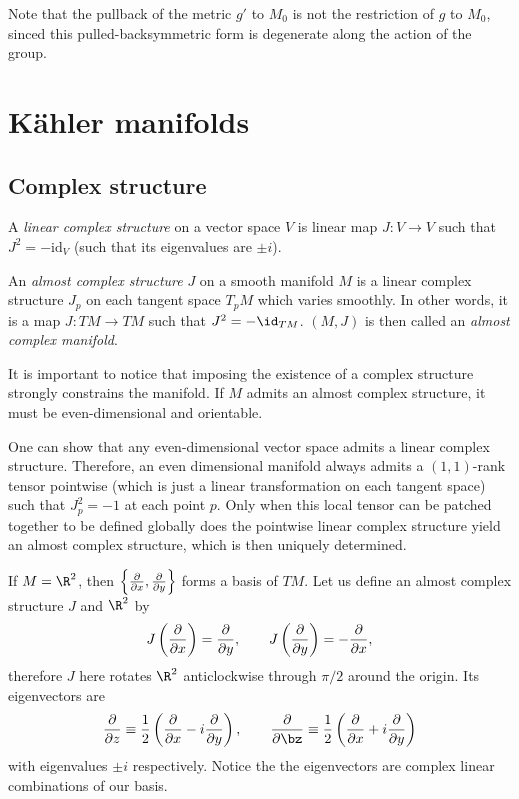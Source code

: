 \documentclass{worksheetclass}
\begin{document}
    Note that the pullback of the metric $g'$ to $M_0$ is not the restriction of $g$ to $M_0$, sinced this pulled-backsymmetric form is degenerate along the action of the group.

\section{Kähler manifolds}

    \subsection{Complex structure}

        \begin{defn}
            A \emph{linear complex structure} on a vector space $V$ is linear map $J:V\to V$ such that $J^2=-\text{id}_V$ (such that its eigenvalues are $\pm i$).
        \end{defn}
        
        \begin{defn}
            An \emph{almost complex structure} $J$ on a smooth manifold $M$ is a linear complex structure $J_p$ on each tangent space $T_pM$ which varies smoothly. In other words, it is a map $J:TM\to TM$ such that $J^2=-\id_{TM}$. $(M,J)$ is then called an \emph{almost complex manifold}.
        \end{defn}
        
        It is important to notice that imposing the existence of a complex structure strongly constrains the manifold. If $M$ admits an almost complex structure, it must be even-dimensional and orientable.

        One can show that any even-dimensional vector space admits a linear complex structure. Therefore, an even dimensional manifold always admits a $(1,1)$-rank tensor pointwise (which is just a linear transformation on each tangent space) such that $J^2_p=-1$ at each point $p$. Only when this local tensor can be patched together to be defined globally does the pointwise linear complex structure yield an almost complex structure, which is then uniquely determined.

        \begin{examp}
            If $M=\R^2$, then $\left\{\pdv{}{x},\pdv{}{y}\right\}$ forms a basis of $TM$. Let us define an almost complex structure $J$ and $\R^2$ by
            \begin{equation}
                J\left( \pdv{}{x} \right)=\pdv{}{y},\qquad J\left( \pdv{}{y} \right)=-\pdv{}{x},
            \end{equation}
            therefore $J$ here rotates $\R^2$ anticlockwise through $\pi/2$ around the origin. Its eigenvectors are
            \begin{equation}
                \pdv{}{z}\equiv\frac{1}{2}\left(\pdv{}{x}-i\pdv{}{y}\right),\qquad \pdv{}{\bz}\equiv\frac{1}{2}\left(\pdv{}{x}+i\pdv{}{y}\right) 
            \end{equation}
            with eigenvalues $\pm i$ respectively. Notice the the eigenvectors are complex linear combinations of our basis. 
        \end{examp}
\end{document}
